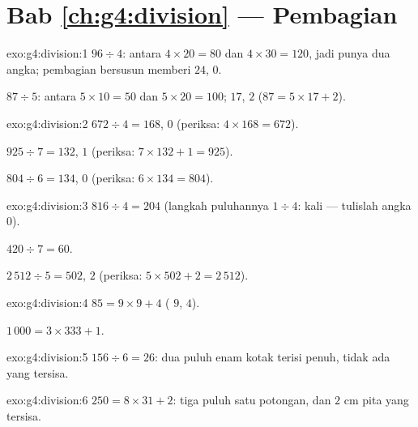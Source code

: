 \section*{Bab \ref{ch:g4:division} --- Pembagian}

\begin{solution}{exo:g4:division:1}
$96 \div 4$: antara $4 \times 20 = 80$ dan $4 \times 30 = 120$, jadi
 punya dua angka; pembagian bersusun memberi $24$,
 $0$.

$87 \div 5$: antara $5 \times 10 = 50$ dan $5 \times 20 = 100$;
 $17$,  $2$ ($87 = 5 \times 17 + 2$).
\end{solution}

\begin{solution}{exo:g4:division:2}
$672 \div 4 = 168$,  $0$ (periksa: $4 \times 168 = 672$).

$925 \div 7 = 132$,  $1$ (periksa:
$7 \times 132 + 1 = 925$).

$804 \div 6 = 134$,  $0$ (periksa: $6 \times 134 = 804$).
\end{solution}

\begin{solution}{exo:g4:division:3}
$816 \div 4 = 204$ (langkah puluhannya $1 \div 4$:  kali ---
tulislah angka $0$).

$420 \div 7 = 60$.

$2\,512 \div 5 = 502$,  $2$ (periksa:
$5 \times 502 + 2 = 2\,512$).
\end{solution}

\begin{solution}{exo:g4:division:4}
$85 = 9 \times 9 + 4$ ( $9$,  $4$).

$1\,000 = 3 \times 333 + 1$.
\end{solution}

\begin{solution}{exo:g4:division:5}
$156 \div 6 = 26$: dua puluh enam kotak terisi penuh, tidak ada yang tersisa.
\end{solution}

\begin{solution}{exo:g4:division:6}
$250 = 8 \times 31 + 2$: tiga puluh satu potongan, dan $2$ cm pita
yang tersisa.
\end{solution}

